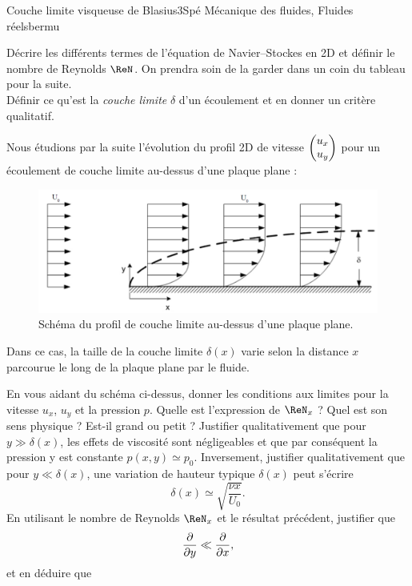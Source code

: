 
\begin{exercise}{Couche limite visqueuse de Blasius}{3}{Spé}
{Mécanique des fluides, Fluides réels}{bermu}

\begin{questions}
    \questioncours Décrire les différents termes de l'équation de Navier--Stockes en 2D et définir le nombre de Reynolds $\ReN$. On prendra soin de la garder dans un coin du tableau pour la suite. \\
    Définir ce qu'est la \emph{couche limite} $\delta$ d'un écoulement et en donner un critère qualitatif.
\begin{EnvUplevel}
Nous étudions par la suite l'évolution du profil 2D de vitesse $\mqty(u_x \\ u_y)$ pour un écoulement de couche limite au-dessus d'une plaque plane :
\begin{figure}[H]
    \centering
    \includegraphics[width=0.8\linewidth]{mecaflu/blasius1.png}
    \vspace{-1em}
    \caption{Schéma du profil de couche limite au-dessus d'une plaque plane.}
\end{figure}
Dans ce cas, la taille de la couche limite $\delta(x)$ varie selon la distance $x$ parcourue le long de la plaque plane par le fluide.
\end{EnvUplevel}
    \question En vous aidant du schéma ci-dessus, donner les conditions aux limites pour la vitesse $u_x$, $u_y$ et la pression $p$.
    \question Quelle est l'expression de $\ReN_x$ ? Quel est son sens physique ? Est-il grand ou petit ?
    \question Justifier qualitativement que pour $y\gg\delta(x)$, les effets de viscosité sont négligeables et que par conséquent la pression y est constante $p(x,y) \simeq p_0$.
    \question Inversement, justifier qualitativement que pour $y\ll\delta(x)$, une variation de hauteur typique $\delta(x)$ peut s'écrire
    $$\delta(x) \simeq \sqrt{\dfrac{\nu x}{U_0}}.$$
    \question En utilisant le nombre de Reynolds $\ReN_x$ et le résultat précédent, justifier que
    $$\pdv{}{y} \ll \pdv{}{x},$$
    et en déduire que
    \begin{parts}

\end{parts}
\end{questions}
\end{exercise}
